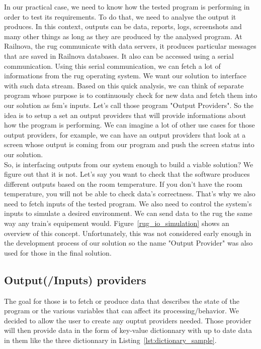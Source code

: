 \documentclass[12pt]{article}
\theoremstyle{definition}
\theoremstyle{definition}
\theoremstyle{remark}
\begin{document}
In our practical case, we need to know how the tested program is performing in order to test its requirements. To do that, we need to analyse the output it produces. In this context, outputs can be data, reports, logs, screenshots and many other things as long as they are produced by the analysed program. At Railnova, the \gls{rug} communicate with data servers, it produces particular messages that are saved in Railnova databases. It also can be accessed using a serial communication. Using this serial communication, we can fetch a lot of informations from the \gls{rug} operating system. We want our solution to interface with such data stream. Based on this quick analysis, we can think of separate program whose purpose is to continuously check for new data and fetch them into our solution as \gls{fsm}'s inputs. Let's call those program "Output Providers". So the idea is to setup a set an output providers that will provide informations about how the program is performing. We can imagine a lot of other use cases for those output providers, for example, we can have an output providers that look at a screen whose output is coming from our program and push the screen status into our solution.\\

So, is interfacing outputs from our system enough to build a viable solution? We figure out that it is not. Let's say you want to check that the software produces different outputs based on the room temperature. If you don't have the room temperature, you will not be able to check data's correctness. That's why we also need to fetch inputs of the tested program. We also need to control the system's inputs to simulate a desired environment. We can send data to the \gls{rug} the same way any train's equipement would. Figure~\ref{rug_io_simulation} shows an overview of this concept. Unfortunately, this was not considered early enough in the development process of our solution so the name "Output Provider" was also used for those in the final solution.



\subsection{Output(/Inputs) providers}\label{sec:providers}


The goal for those is to fetch or produce data that describes the state of the program or the various variables that can affect its processing/behavior. We decided to allow the user to create any ouptut providers needed. Those provider will then provide data in the form of key-value dictionnary with up to date data in them like the three dictionnary in Listing~\ref{lst:dictionary_sample}.
\end{document}
